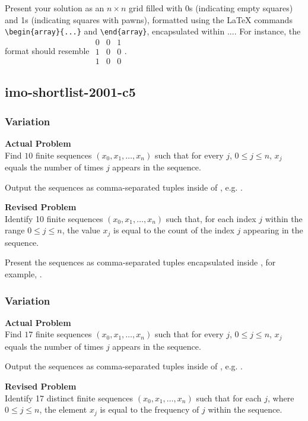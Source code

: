 Present your solution as an $n \times n$ grid filled with 0s (indicating empty squares) and 1s (indicating squares with pawns), formatted using the LaTeX commands \verb|\begin{array}{...}| and \verb|\end{array}|, encapsulated within $\boxed{...}$. For instance, the format should resemble $\boxed{\begin{array}{ccc}0 & 0 & 1 \\ 1 & 0 & 0 \\ 1 & 0 & 0\end{array}}$.

\subsection{imo-shortlist-2001-c5}
\subsubsection{Variation}
\textbf{Actual Problem}\\
Find $10$ finite sequences $(x_0, x_1, \ldots, x_n)$ such that for every $j$, $0 \leq j \leq n$, $x_j$ equals the number of times $j$ appears in the sequence.

Output the sequences as comma-separated tuples inside of \boxed{}, e.g. .

\textbf{Revised Problem}\\
Identify 10 finite sequences $(x_0, x_1, \ldots, x_n)$ such that, for each index $j$ within the range $0 \leq j \leq n$, the value $x_j$ is equal to the count of the index $j$ appearing in the sequence.

Present the sequences as comma-separated tuples encapsulated inside \boxed{}, for example, .

\subsubsection{Variation}
\textbf{Actual Problem}\\
Find $17$ finite sequences $(x_0, x_1, \ldots, x_n)$ such that for every $j$, $0 \leq j \leq n$, $x_j$ equals the number of times $j$ appears in the sequence.

Output the sequences as comma-separated tuples inside of \boxed{}, e.g. .

\textbf{Revised Problem}\\
Identify 17 distinct finite sequences $(x_0, x_1, \ldots, x_n)$ such that for each $j$, where $0 \leq j \leq n$, the element $x_j$ is equal to the frequency of $j$ within the sequence.

